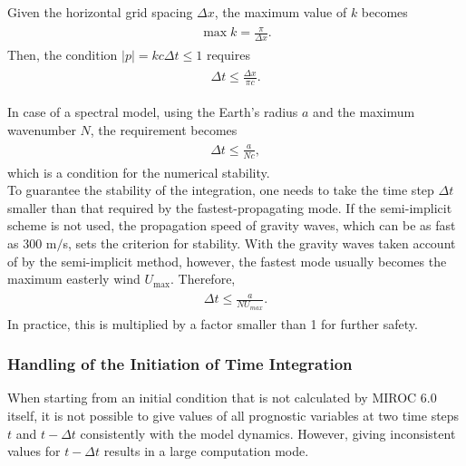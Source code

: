 Given the horizontal grid spacing \(\Delta x\), the maximum value of \(k\) becomes \begin{eqnarray}\begin{aligned}
  \max k = \frac{\pi}{\Delta x}.\end{aligned}\end{eqnarray} Then, the condition \(|p|=kc \Delta t \le 1\) requires \begin{eqnarray}\begin{aligned}
   \Delta t \le \frac{\Delta x}{\pi c}.\end{aligned}\end{eqnarray}

In case of a spectral model, using the Earth's radius \(a\) and the maximum wavenumber \(N\), the requirement becomes \begin{eqnarray}\begin{aligned}
   \Delta t \le \frac{a}{N c},\end{aligned}\end{eqnarray} which is a condition for the numerical stability.\\
To guarantee the stability of the integration, one needs to take the time step \(\Delta t\) smaller than that required by the fastest-propagating mode. If the semi-implicit scheme is not used, the
propagation speed of gravity waves, which can be as fast as 300 m\(/\)s, sets the criterion for stability. With the gravity waves taken account of by the semi-implicit method, however, the fastest
mode usually becomes the maximum easterly wind \(U_{\mathrm{max}}\). Therefore, \begin{eqnarray}\begin{aligned}
   \Delta t \le \frac{a}{N U_{max}} .\end{aligned}\end{eqnarray} In practice, this is multiplied by a factor smaller than 1 for further safety.

\hypertarget{handling-of-the-initiation-of-time-integration}{%
\subsubsection{Handling of the Initiation of Time Integration}\label{handling-of-the-initiation-of-time-integration}}

When starting from an initial condition that is not calculated by MIROC 6.0 itself, it is not possible to give values of all prognostic variables at two time steps \(t\) and \(t-\Delta t\)
consistently with the model dynamics. However, giving inconsistent values for \(t-\Delta t\) results in a large computation mode.


